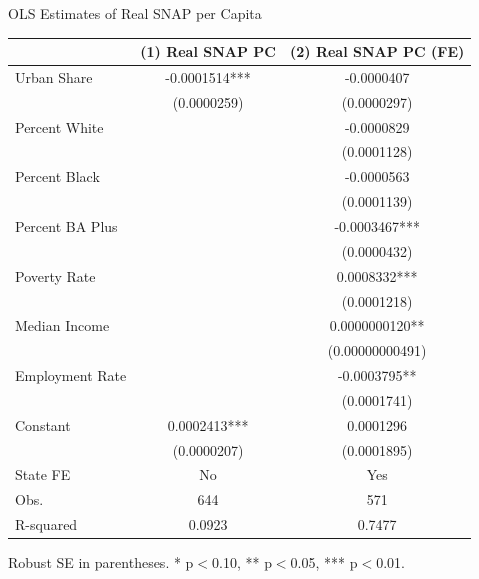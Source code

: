 \documentclass{beamer}
\begin{document}
\begin{frame}{OLS Estimates of Real SNAP per Capita}
\tiny
\centering

\begin{tabular}{lcc}
\hline
 & (1) Real SNAP PC & (2) Real SNAP PC (FE) \\
\hline
Urban Share      & -0.0001514*** & -0.0000407 \\
                 & (0.0000259)   & (0.0000297) \\
Percent White    &               & -0.0000829 \\
                 &               & (0.0001128) \\
Percent Black    &               & -0.0000563 \\
                 &               & (0.0001139) \\
Percent BA Plus  &               & -0.0003467*** \\
                 &               & (0.0000432) \\
Poverty Rate     &               & 0.0008332*** \\
                 &               & (0.0001218) \\
Median Income    &               & 0.0000000120** \\
                 &               & (0.00000000491) \\
Employment Rate  &               & -0.0003795** \\
                 &               & (0.0001741) \\
Constant         & 0.0002413*** & 0.0001296 \\
                 & (0.0000207)   & (0.0001895) \\
\hline
State FE         & No            & Yes \\
Obs.             & 644           & 571 \\
R-squared        & 0.0923        & 0.7477 \\
\hline
\end{tabular}

\vspace{2mm}
\scriptsize Robust SE in parentheses. * p$<$0.10, ** p$<$0.05, *** p$<$0.01.
\end{frame}
\end{document}
